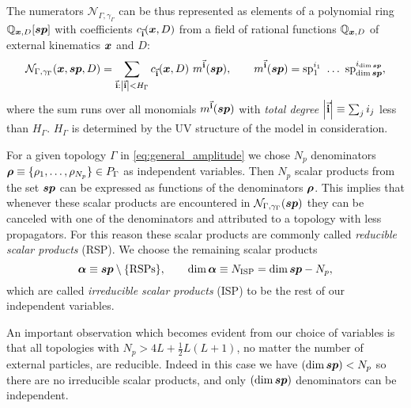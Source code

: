 The numerators $\mathcal{N}_{\Gamma,\gamma_\Gamma}$ can be thus represented as elements of a polynomial ring
$\mathbb{Q}_{\vb*{x},D}[\vb*{sp}]$ 
with coefficients $c_{\va{i}}(\vb*{x},D)$ from a field of rational functions $\mathbb{Q}_{\vb*{x},D}$ of external kinematics $\vb*{x}$ and $D$:
\begin{equation}
  \mathcal{N}_{\Gamma,\gamma_\Gamma}(\vb*{x}, \vb*{sp}, D) = \sum_{\va{i} : \abs{\va{i}} < H_{\Gamma}} c_{\va{i}} (\vb*{x},D)~ m^{\va{i}}(\vb*{sp}),
  \qquad m^{\va{i}}(\vb*{sp}) = \mathrm{sp}_1^{i_1} ~\ldots{}~ \mathrm{sp}_{\dim{\vb*{sp}}}^{i_{\dim{\vb*{sp}}}},
\end{equation}
where the sum runs over all monomials $m^{\va{i}}(\vb*{sp})$ with \emph{total degree} $\abs{\va{i}} \equiv \sum_j i_j$ less than
$ H_{\Gamma} $. $ H_{\Gamma} $ is determined by the UV structure of the model in consideration.


For a given topology $\Gamma$ in \cref{eq:general_amplitude} we chose $N_p$ denominators $\vb*{\rho}\equiv\{\rho_1,\ldots,\rho_{N_p}\} \in P_\Gamma$ as
independent variables. Then $N_p$ scalar products from the set $\vb*{sp}$
can be expressed as functions of the denominators $\vb*{\rho}$.
This implies
that whenever these scalar products are encountered in $\mathcal{N}_{\Gamma,\gamma_\Gamma}\qty(\vb*{sp})$ they can be canceled with
one of the denominators and attributed to a topology with less propagators.
For this reason these scalar products are commonly called \emph{reducible scalar products} (RSP).
We choose the remaining scalar products
\begin{equation}
  \vb*{\alpha} \equiv \vb*{sp} \setminus \{\text{RSPs}\} , \qquad \dim{\vb*{\alpha}} \equiv N_\text{ISP} =  \dim{\vb*{sp}}-N_p,
\end{equation}
which are called
\emph{irreducible scalar products} (ISP) to be the rest of our independent variables.

An important observation which becomes evident from our choice of variables is that all topologies with $N_p> 4 L +\frac{1}{2}L(L+1)$, no matter the number of external particles, are reducible.
Indeed in this case we have $(\dim\vb*{sp}) < N_p$ so there are no irreducible scalar products, and only $(\dim\vb*{sp})$ denominators can be independent.



